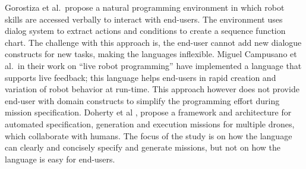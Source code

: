 Gorostiza et al.\,\cite{Gorostiza2011} propose a natural programming environment in which robot skills are accessed verbally to interact with end-users. The environment uses dialog system to extract actions and conditions to create a sequence function chart. The challenge with this approach is, the end-user cannot add new dialogue constructs for new tasks, making the languages inflexible. %
Miguel Campusano et al.\,\cite{campusano.ea:2017:live} in their work on ``live robot programming'' have implemented a language that supports live  feedback; this language helps end-users in rapid creation and variation of robot behavior at run-time. This approach however does not provide end-user with domain constructs to simplify the programming effort during mission specification. Doherty et al \cite{Doherty2013}, propose a framework and architecture for automated specification, generation and execution missions for multiple drones, which collaborate with humans. The focus of the study is on how the language can clearly and concisely specify and generate missions, but not on how the language is easy for %
end-users.
